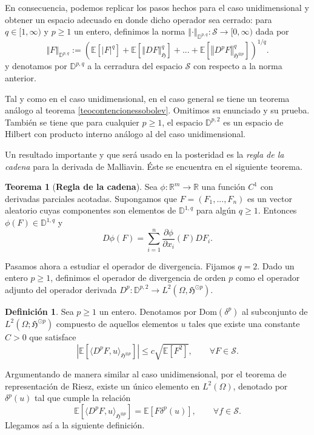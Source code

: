\documentclass[letterpaper,twoside,12pt]{book}
\newcommand{\R}{\mathbb{R}}
\newcommand{\D}{\mathbb{D}}
\renewcommand{\S}{\mathcal{S}}
\newcommand{\E}{\mathbb{E}}
\newcommand{\1}{\mathds{1}}
\newcommand{\abs}[1]{\left\lvert #1 \right\rvert}
\renewcommand{\to}{\rightarrow}
\newcommand{\norm}[1]{\left\Vert #1 \right\Vert}
\theoremstyle{definition}
\newtheorem{dfn}{Definición}
\theoremstyle{definition}
\newtheorem{teo}{Teorema}
\theoremstyle{remark}
\theoremstyle{definition}
\theoremstyle{definition}
\theoremstyle{definition}
\theoremstyle{definition}
\theoremstyle{definition}
\begin{document}
En consecuencia, podemos replicar los pasos hechos para el caso unidimensional y obtener un espacio adecuado en donde dicho operador sea cerrado: para $q\in [1,\infty)$ y $p\geq1$ un entero, definimos la norma $\norm{\cdot}_{\D^{p,q}}:\S\to [0,\infty)$ dada por 
\[
\norm{F}_{\D^{p,q}}:= \left(\E\left[\abs{F}^{q}\right]+\E\left[\norm{DF}^{q}_{\mathfrak{H}}\right]+...+\E\left[\norm{D^pF}_{\mathfrak{H}^{\otimes p}}^q\right]\right)^{1/q}.
\]
y denotamos por $\D^{p,q}$ a la cerradura del espacio $\S$ con respecto a la norma anterior. 

Tal y como en el caso unidimensional, en el caso general se tiene un teorema análogo al teorema \ref{teocontencionessobolev}. Omitimos su enunciado y su prueba. También se tiene que para cualquier $p\geq1$, el espacio $\D^{p,2}$ es un espacio de Hilbert con producto interno análogo al del caso unidimensional.

Un resultado importante y que será usado en la posteridad es la \textit{regla de la cadena} para la derivada de Malliavin. Éste se encuentra en el siguiente teorema.

\begin{teo}[\textbf{Regla de la cadena}]\label{reglacadena} 
 Sea $\phi:\R^{m}\to \R$ una función $C^1$ con derivadas parciales acotadas. Supongamos que $F=(F_1,...,F_n)$ es un vector aleatorio cuyas componentes son elementos de $\D^{1,q}$ para algún $q\geq1$. Entonces $\phi(F)\in \D^{1,q}$ y 
 \[
D\phi(F)=\sum_{i=1}^n \frac{\partial \phi}{\partial x_i}(F)DF_i.
 \]
 \end{teo}
Pasamos ahora a estudiar el operador de divergencia. Fijamos $q=2$. Dado un entero $p\geq1$, definimos el operador de divergencia de orden $p$ como el operador adjunto del operador derivada $D^{p}:\D^{p,2}\to L^{2}(\Omega,\mathfrak{H}^{\odot p})$.

\begin{dfn} 
 Sea $p\geq1$ un entero. Denotamos por $\text{Dom}(\delta^p)$ al subconjunto de $L^2(\Omega;\mathfrak{H}^{\odot p})$ compuesto de aquellos elementos $u$ tales que existe una constante $C>0$ que satisface 
 \[
 \abs{\E\left[\langle D^pF,u\rangle_{\mathfrak{H}^{\otimes p}}\right]}\leq c\sqrt{\E\left[F^2\right]}, \qquad \forall F \in \S.
 \]
 \end{dfn}
 Argumentando de manera similar al caso unidimensional, por el teorema de representación de Riesz, existe un único elemento en $L^2(\Omega)$, denotado por $\delta^p(u)$ tal que cumple la relación 
 \[
 \E\left[\langle D^pF,u\rangle_{\mathfrak{H}^{\otimes p}}\right]=\E\left[F\delta^{p}(u)\right], \qquad \forall f\in \S.
 \]
 Llegamos así a la siguiente definición.
\end{document}
